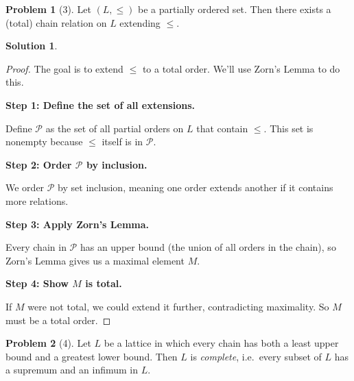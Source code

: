 \documentclass[12pt]{article}
\theoremstyle{definition} %
\newtheorem{solution}{Solution}
\newtheorem{problem}{Problem}
\theoremstyle{plain} %
\begin{document}
\begin{problem}[3]
    Let $(L,\leq)$ be a partially ordered set. Then there exists a (total) chain relation on $L$ extending $\leq$.
\end{problem}
\begin{solution}
    \begin{proof}
    The goal is to extend $\leq$ to a total order. We'll use Zorn's Lemma to do this.
    
    \textbf{Step 1: Define the set of all extensions.}
    
    Define $\mathcal{P}$ as the set of all partial orders on $L$ that contain $\leq$. This set is nonempty because $\leq$ itself is in $\mathcal{P}$.
    
    \textbf{Step 2: Order $\mathcal{P}$ by inclusion.}
    
    We order $\mathcal{P}$ by set inclusion, meaning one order extends another if it contains more relations.
    
    \textbf{Step 3: Apply Zorn’s Lemma.}
    
    Every chain in $\mathcal{P}$ has an upper bound (the union of all orders in the chain), so Zorn’s Lemma gives us a maximal element $M$.
    
    \textbf{Step 4: Show $M$ is total.}
    
    If $M$ were not total, we could extend it further, contradicting maximality. So $M$ must be a total order.
    \end{proof}
\end{solution}
\begin{problem}[4]
    Let $L$ be a lattice in which every chain has both a least upper bound and a greatest lower bound. Then $L$ is \emph{complete}, i.e.\ every subset of $L$ has a supremum and an infimum in $L$.
\end{problem}
\end{document}

